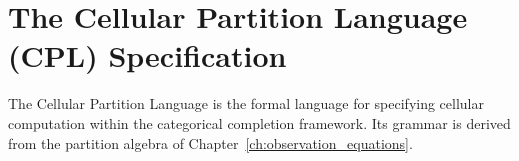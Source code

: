 \chapter{The Cellular Partition Language (CPL) Specification}
\label{app:cpl}


The Cellular Partition Language is the formal language for specifying cellular computation within the categorical completion framework. Its grammar is derived from the partition algebra of Chapter~\ref{ch:observation_equations}.


